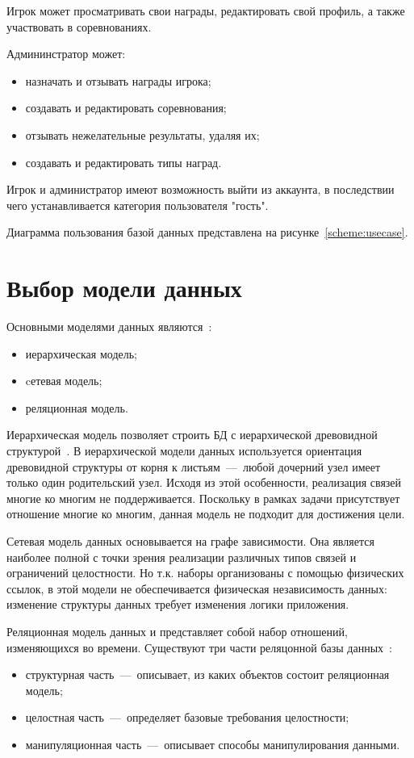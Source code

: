 Игрок может просматривать свои награды, редактировать свой профиль, а также участвовать в соревнованиях.

Админинстратор может:
\begin{itemize}
	\item назначать и отзывать награды игрока;
	\item создавать и редактировать соревнования;
	\item отзывать нежелательные результаты, удаляя их;
	\item создавать и редактировать типы наград.
\end{itemize}

Игрок и администратор имеют возможность выйти из аккаунта, в последствии чего устанавливается категория пользователя "гость".

Диаграмма пользования базой данных представлена на рисунке~\ref{scheme:usecase}.


\section{Выбор модели данных}

Основными моделями данных являются~\cite{karpova}:
\begin{itemize}
	\item иерархическая модель;
	\item cетевая модель;
	\item реляционная модель.
\end{itemize}

Иерархическая модель позволяет строить БД с иерархической древовидной структурой~\cite{karpova}. В иерархической модели данных используется ориентация древовидной
структуры от корня к листьям~---~любой дочерний узел имеет только один родительский узел. Исходя из этой особенности, реализация связей многие ко многим не поддерживается.
Поскольку в рамках задачи присутствует отношение многие ко многим, данная модель не подходит для достижения цели.

Сетевая модель данных основывается на графе зависимости. Она является наиболее полной с точки зрения реализации различных типов связей и ограничений целостности. Но т.к. наборы организованы с помощью физических ссылок, в этой модели не обеспечивается физическая независимость данных: изменение структуры данных требует изменения логики приложения.~\cite{karpova}


Реляционная модель данных и представляет собой набор отношений, изменяющихся во времени. Существуют три части реляцонной базы данных~\cite{relationdb}:
\begin{itemize}
	\item структурная часть~---~описывает, из каких объектов состоит реляционная модель;
	\item целостная часть~---~определяет базовые требования целостности;
	\item манипуляционная часть~---~описывает способы манипулирования данными.
\end{itemize}

